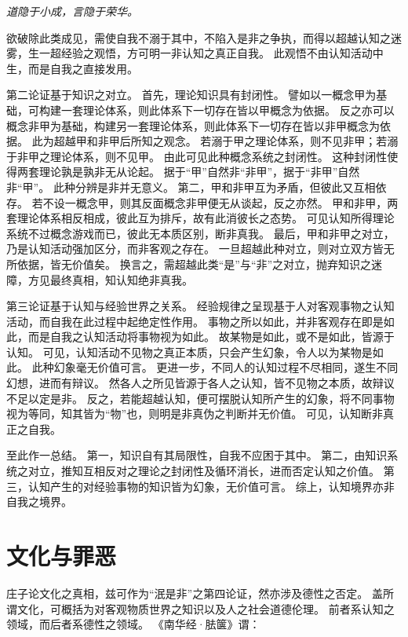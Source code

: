 \documentclass[11pt]{article}
\begin{document}
\textit{道隐于小成，言隐于荣华。}

欲破除此类成见，需使自我不溺于其中，不陷入是非之争执，而得以超越认知之迷雾，生一超经验之观悟，方可明一非认知之真正自我。
此观悟不由认知活动中生，而是自我之直接发用。


\newline

第二论证基于知识之对立。
首先，理论知识具有封闭性。
譬如以一概念甲为基础，可构建一套理论体系，则此体系下一切存在皆以甲概念为依据。
反之亦可以概念非甲为基础，构建另一套理论体系，则此体系下一切存在皆以非甲概念为依据。
此为超越甲和非甲后所知之观念。
若溺于甲之理论体系，则不见非甲；若溺于非甲之理论体系，则不见甲。
由此可见此种概念系统之封闭性。
这种封闭性使得两套理论孰是孰非无从论起。
据于“甲”自然非“非甲”，据于“非甲”自然非“甲”。
此种分辨是非并无意义。
第二，甲和非甲互为矛盾，但彼此又互相依存。
若不设一概念甲，则其反面概念非甲便无从谈起，反之亦然。
甲和非甲，两套理论体系相反相成，彼此互为排斥，故有此消彼长之态势。
可见认知所得理论系统不过概念游戏而已，彼此无本质区别，断非真我。
最后，甲和非甲之对立，乃是认知活动强加区分，而非客观之存在。
一旦超越此种对立，则对立双方皆无所依据，皆无价值矣。
换言之，需超越此类“是”与“非”之对立，抛弃知识之迷障，方见最终真相，知认知绝非真我。

\newline

第三论证基于认知与经验世界之关系。
经验规律之呈现基于人对客观事物之认知活动，而自我在此过程中起绝定性作用。
事物之所以如此，并非客观存在即是如此，而是自我之认知活动将事物视为如此。
故某物是如此，或不是如此，皆源于认知。
可见，认知活动不见物之真正本质，只会产生幻象，令人以为某物是如此。
此种幻象毫无价值可言。
更进一步，不同人的认知过程不尽相同，遂生不同幻想，进而有辩议。
然各人之所见皆源于各人之认知，皆不见物之本质，故辩议不足以定是非。
反之，若能超越认知，便可摆脱认知所产生的幻象，将不同事物视为等同，知其皆为“物”也，则明是非真伪之判断并无价值。
可见，认知断非真正之自我。

\newline

至此作一总结。
第一，知识自有其局限性，自我不应困于其中。
第二，由知识系统之对立，推知互相反对之理论之封闭性及循环消长，进而否定认知之价值。
第三，认知产生的对经验事物的知识皆为幻象，无价值可言。
综上，认知境界亦非自我之境界。

\section{文化与罪恶}
庄子论文化之真相，兹可作为“泯是非”之第四论证，然亦涉及德性之否定。
盖所谓文化，可概括为对客观物质世界之知识以及人之社会道德伦理。
前者系认知之领域，而后者系德性之领域。
《南华经·胠箧》谓：
\end{document}
